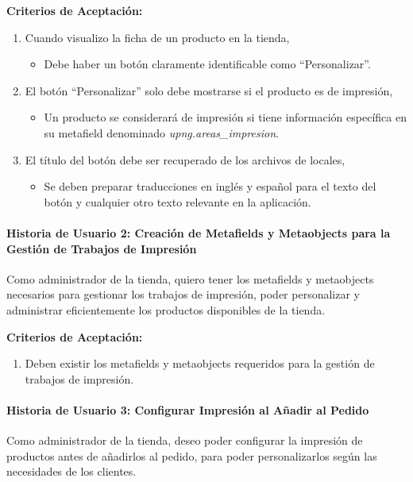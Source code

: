 \documentclass[12pt]{article}
\newcommand{\subsubsubsection}[1]{\paragraph{#1}}
\begin{document}
\vspace{0.5cm}
\textbf{Criterios de Aceptación:}
\begin{enumerate}[label=\arabic*.]
    \item Cuando visualizo la ficha de un producto en la tienda,
          \begin{itemize}[label=--]
              \item Debe haber un botón claramente identificable como ``Personalizar''.    
          \end{itemize}
    \item El botón ``Personalizar'' solo debe mostrarse si el producto es de impresión,
          \begin{itemize}[label=--]
              \item Un producto se considerará de impresión si tiene información específica en su metafield denominado \textit{upng.areas\_impresion}.
          \end{itemize}
    \item El título del botón debe ser recuperado de los archivos de locales,
          \begin{itemize}[label=--]
              \item Se deben preparar traducciones en inglés y español para el texto del botón y cualquier otro texto relevante en la aplicación.
          \end{itemize}
\end{enumerate}


\subsubsubsection{Historia de Usuario 2: Creación de Metafields y Metaobjects para la Gestión de Trabajos de Impresión}\label{sec:historia2}

Como administrador de la tienda,
quiero tener los metafields y metaobjects necesarios para gestionar los trabajos de impresión,
poder personalizar y administrar eficientemente los productos disponibles de la tienda.

\vspace{0.5cm}
\textbf{Criterios de Aceptación:}
\begin{enumerate}[label=\arabic*.]
    \item Deben existir los metafields y metaobjects requeridos para la gestión de trabajos de impresión.
\end{enumerate}


\subsubsubsection{Historia de Usuario 3: Configurar Impresión al Añadir al Pedido}\label{sec:historia3}

Como administrador de la tienda, deseo poder configurar la impresión de productos antes de añadirlos al pedido, para poder personalizarlos según las necesidades de los clientes.
\end{document}
